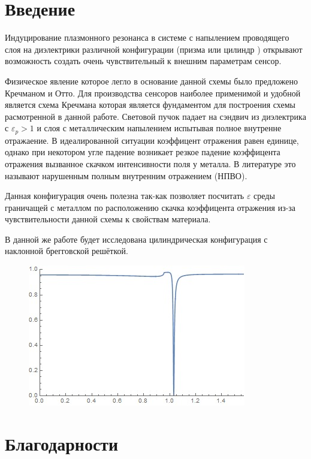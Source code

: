 

\section*{Введение}\label{intro}

Индуцирование плазмонного резонанса в системе с напылением проводящего слоя на диэлектрики различной конфигурации (призма или цилиндр ) открывают возможность создать очень чувствительный к внешним параметрам сенсор.

Физическое явление которое легло в основание данной схемы было предложено Кречманом и Отто. Для производства сенсоров наиболее применимой и удобной является схема Кречмана которая является фундаментом для построения схемы расмотренной в данной работе.
Световой пучок падает на сэндвич из диэлектрика с $ \varepsilon_p >1 $ и слоя с металлическим напылением испытывая полное внутренне отражаение. В идеалированной ситуации коэффицент отражения равен единице, однако при некотором угле падение возникает резкое падение коэффицента отражения вызванное скачком интенсивности поля у металла. В литературе это называют нарушенным полным внутренним отражением (НПВО).

Данная конфигурация очень полезна так-как позволяет посчитать $ \varepsilon $ среды граничащей с металлом по расположению скачка коэффицента отражения из-за чувствительности данной схемы к свойствам материала.

В данной же работе будет исследована цилиндрическая конфигурация с наклонной брегговской решёткой.

\begin{figure}[h!]
	\centering
	\includegraphics[width=0.5\linewidth]{kretchmann}
	\caption[Эффект Кречмана]{}
	\label{fig:kretchmann}
\end{figure}







\section*{Благодарности}\label{ty}

